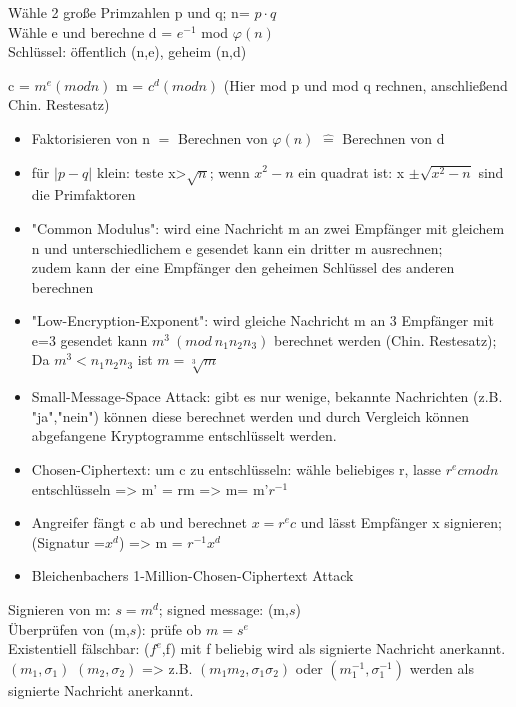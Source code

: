 \begin{multicols}{2}
Wähle 2 große Primzahlen p und q; n= $p \cdot q$\\
Wähle e und berechne d = $e^{-1}$ mod $\varphi(n)$\\
Schlüssel: öffentlich (n,e), geheim (n,d)

c = $m^e (mod n)$
m = $c^d (mod n)$ (Hier mod p und mod q rechnen, anschließend Chin. Restesatz)
\end{multicols}

\begin{itemize}
\item Faktorisieren von n $\hat{=}$ Berechnen von $\varphi (n)$ $\hat{=}$ Berechnen von d 
\item für $\lvert p-q \rvert$ klein: teste x>$\sqrt{n}$; wenn $x^2 -n$ ein quadrat ist: x $\pm \sqrt{x^2 -n}$ sind die Primfaktoren
\item "Common Modulus": wird eine Nachricht m an zwei Empfänger mit gleichem n und unterschiedlichem e gesendet kann ein dritter m ausrechnen;\\
zudem kann der eine Empfänger den geheimen Schlüssel des anderen berechnen
\item "Low-Encryption-Exponent": wird gleiche Nachricht m an 3 Empfänger mit e=3 gesendet kann $m^3~(mod~n_1n_2n_3)$ berechnet werden (Chin. Restesatz);
Da $m^3 < n_1n_2n_3$ ist $m = \sqrt[3]{m}$
\item Small-Message-Space Attack: gibt es nur wenige, bekannte Nachrichten (z.B. "ja","nein") können diese berechnet werden und durch Vergleich können abgefangene Kryptogramme entschlüsselt werden.
\item Chosen-Ciphertext: um c zu entschlüsseln: wähle beliebiges r, lasse $r^ec mod n$ entschlüsseln => m' = rm => m= m'$r^{-1}$
\item Angreifer fängt c ab und berechnet $x=r^ec$ und lässt Empfänger x signieren; (Signatur =$x^d$) => m = $r^{-1}x^d$ 
\item Bleichenbachers 1-Million-Chosen-Ciphertext Attack
\end{itemize}


Signieren von m: $s = m^d$; 	signed message: (m,$s$)\\
Überprüfen von (m,$s$): prüfe ob $m = s^e$\\
Existentiell fälschbar: ($f^e$,f) mit f beliebig wird als signierte Nachricht anerkannt.\\
$(m_1,\sigma_1) $ $(m_2,\sigma_2) $ => z.B. $(m_1m_2,\sigma_1\sigma_2)$ oder $(m_1^{-1},\sigma_1^{-1})$ werden als signierte Nachricht anerkannt.\\

